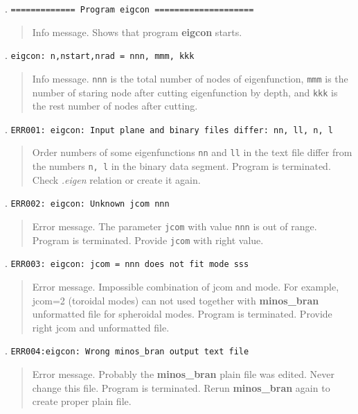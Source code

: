 . \texttt{============= Program eigcon ====================} 
\begin{quote}  
Info message. Shows that program {\bf eigcon} starts.
\end{quote}
. \texttt{eigcon: n,nstart,nrad = nnn, mmm, kkk}
\begin{quote}  
Info message. {\tt nnn} is the total number of nodes  of eigenfunction,
{\tt mmm} is the number of staring node after cutting eigenfunction by depth,
and {\tt kkk} is the rest number of nodes after cutting.
\end{quote}
. \texttt{ERR001: eigcon: Input plane and binary files differ: nn, ll, n, l }
\begin{quote}  
\noindent Order numbers of some eigenfunctions {\tt nn} and {\tt ll} in the text 
file differ from the numbers {\tt n, l} in the binary data segment. 
Program is terminated. Check {\it .eigen} relation or create it again.
\end{quote}
. \texttt{ERR002: eigcon: Unknown jcom nnn}
\begin{quote}  
\noindent Error message. The parameter {\tt jcom} with value {\tt nnn} 
is out of range.  Program is terminated. Provide {\tt jcom} with right value.
\end{quote}
. \texttt{ERR003: eigcon: jcom = nnn does not fit mode sss}
\begin{quote}  
\noindent Error message. Impossible combination of jcom and mode. For example,
jcom=2 (toroidal modes) can not used together with {\bf minos\_bran} 
unformatted file for spheroidal modes.
Program is terminated. Provide right jcom and unformatted file.
\end{quote}
. \texttt{ERR004:eigcon: Wrong minos\_bran output text file}
\begin{quote}  
\noindent Error message. Probably the {\bf minos\_bran} plain file was edited.
Never change this file. Program is terminated. Rerun {\bf minos\_bran} again
to create proper plain file.
\end{quote}
